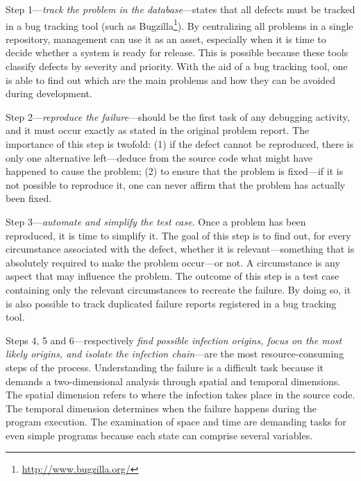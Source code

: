 Step 1---\textit{track the problem in the database}---states that all defects
must be tracked in a bug tracking tool (such as
Bugzilla\footnote{\url{http://www.bugzilla.org/}}). By centralizing all problems
in a single repository, management can use it as an asset, especially when it is
time to decide whether a system is ready for release. This is possible because
these tools classify defects by severity and priority. With the aid of a
bug tracking tool, one is able to find out which are the main problems and how
they can be avoided during development.

Step 2---\textit{reproduce the failure}---should be the first task of any
debugging activity, and it must occur exactly as stated in the original problem
report. The importance of this step is twofold: (1) if the defect cannot be
reproduced, there is only one alternative left---deduce from the source code what
might have happened to cause the problem; (2) to ensure that the problem is
fixed---if it is not possible to reproduce it, one can never affirm that the
problem has actually been fixed.

Step 3---\textit{automate and simplify the test case}. Once a problem has been
reproduced, it is time to simplify it.
The goal of this step is to find out, for every circumstance associated with the
defect, whether it is relevant---something that is absolutely required to make
the problem occur---or not. A circumstance is any aspect that may influence the
problem. The outcome of this step is a test case containing only the relevant
circumstances to recreate the failure. By doing so, it is also possible  to
track duplicated failure reports registered in a bug tracking tool.

Steps 4, 5 and 6---respectively \textit{find possible infection origins, focus
on the most likely origins, and isolate the infection chain}---are the most
resource-consuming steps of the process. Understanding the failure is a
difficult task because it demands a two-dimensional analysis through spatial and
temporal dimensions.
The spatial dimension refers to  where the infection takes place in the source
code. The temporal dimension determines when  the failure happens during the
program execution. The examination of space and time are demanding tasks for
even  simple programs because each state can comprise several variables.

